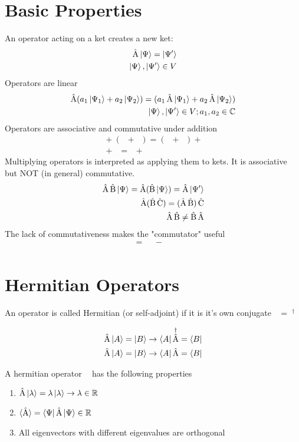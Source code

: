 \documentclass[10pt,a4paper]{book}
\DeclareMathOperator {\opA} {\hat{A}}
\DeclareMathOperator {\opB} {\hat{B}}
\DeclareMathOperator {\opC} {\hat{C}}
\begin{document}
\section{Basic Properties}
An operator acting on a ket creates a new ket:
\begin{align}
	\opA \ket{\Psi} = \ket{\Psi'} \\
	\ket{\Psi}, \ket{\Psi'} \in V
\end{align}
Operators are linear
\begin{align}
	\opA (a_1\ket{\Psi_1} + a_2\ket{\Psi_2}) = (a_1\opA\ket{\Psi_1} + a_2\opA\ket{\Psi_2}) \\
	\ket{\Psi}, \ket{\Psi'} \in V; a_1, a_2 \in \mathbb{C}
\end{align}
Operators are associative and commutative under addition
\begin{align}
	\opA + (\opB + \opC) = (\opA + \opB) + \opC \\
	\opA + \opB = \opB + \opA
\end{align}
Multiplying operators is interpreted as applying them to kets. It is associative but NOT (in general) commutative.
\begin{align}
	\opA\opB\ket{\Psi} = \opA(\opB\ket{\Psi}) = \opA\ket{\Psi'} \\
	\opA(\opB\opC) = (\opA\opB)\opC                             \\
	\opA\opB \ne \opB\opA
\end{align}
The lack of commutativeness makes the "commutator" useful
\begin{align}
	[\opA, \opB] = \opA\opB - \opB\opA \\
\end{align}
    \section{Hermitian Operators}
    An operator is called Hermitian (or self-adjoint) if it is it's own conjugate $\opA = \opA^\dagger$

\begin{align}
	\opA\ket{A} = \ket{B} \rightarrow \bra{A}\opA^\dagger = \bra{B} \\
	\opA\ket{A} = \ket{B} \rightarrow \bra{A}\opA = \bra{B}         \\
\end{align}

A hermitian operator $\opA$ has the following properties
\begin{enumerate}
	\item $\opA\ket{\lambda} = \lambda \ket{\lambda} \rightarrow \lambda \in \mathbb{R}$
	\item $\braket{\opA} = \bra{\Psi}\opA\ket{\Psi} \in \mathbb{R}$
	\item All eigenvectors with different eigenvalues are orthogonal
\end{enumerate}
\end{document}
